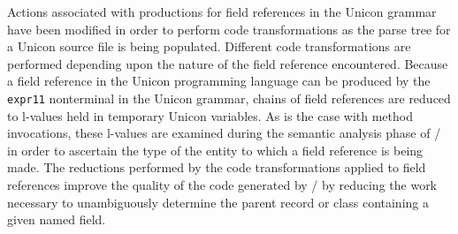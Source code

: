 Actions associated with productions for field references in the Unicon
grammar have been modified in order to perform code transformations as
the parse tree for a Unicon source file is being populated.  Different
code transformations are performed depending upon the nature of the
field reference encountered. Because a field reference in the Unicon
programming language can be produced by the \texttt{expr11}
nonterminal in the Unicon grammar, chains of field references are
reduced to \mbox{l-values} held in temporary Unicon variables.  As is
the case with method invocations, these \mbox{l-values} are examined
during the semantic analysis phase of \Ic/ in order to ascertain the
type of the entity to which a field reference is being made. The
reductions performed by the code transformations applied to field
references improve the quality of the code generated by \Ic/ by
reducing the work necessary to unambiguously determine the parent
record or class containing a given named field.

